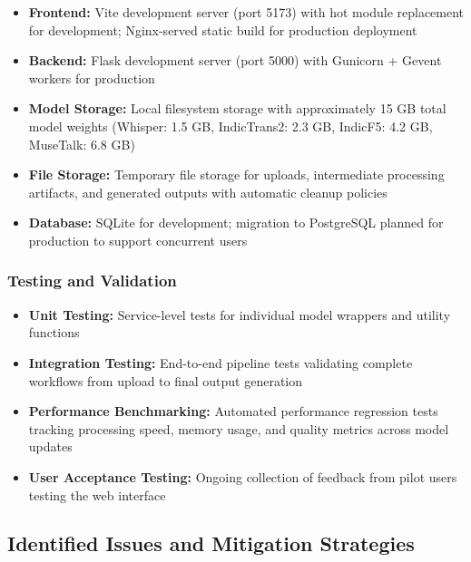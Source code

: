 \documentclass[12pt,oneside]{report}
\begin{document}
\begin{itemize}
    \item \textbf{Frontend:} Vite development server (port 5173) with hot module replacement for development; Nginx-served static build for production deployment
    
    \item \textbf{Backend:} Flask development server (port 5000) with Gunicorn + Gevent workers for production
    
    \item \textbf{Model Storage:} Local filesystem storage with approximately 15 GB total model weights (Whisper: 1.5 GB, IndicTrans2: 2.3 GB, IndicF5: 4.2 GB, MuseTalk: 6.8 GB)
    
    \item \textbf{File Storage:} Temporary file storage for uploads, intermediate processing artifacts, and generated outputs with automatic cleanup policies
    
    \item \textbf{Database:} SQLite for development; migration to PostgreSQL planned for production to support concurrent users
\end{itemize}

\subsubsection{Testing and Validation}

\begin{itemize}
    \item \textbf{Unit Testing:} Service-level tests for individual model wrappers and utility functions
    
    \item \textbf{Integration Testing:} End-to-end pipeline tests validating complete workflows from upload to final output generation
    
    \item \textbf{Performance Benchmarking:} Automated performance regression tests tracking processing speed, memory usage, and quality metrics across model updates
    
    \item \textbf{User Acceptance Testing:} Ongoing collection of feedback from pilot users testing the web interface
\end{itemize}

\subsection{Identified Issues and Mitigation Strategies}
\end{document}

